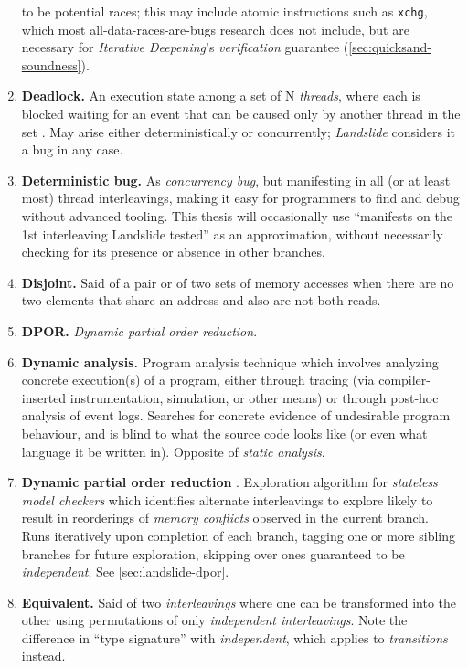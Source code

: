 \begin{enumerate}
		to be potential races;
		this may include atomic instructions such as {\tt xchg},
		which most all-data-races-are-bugs research does not include,
		but are necessary for {\em Iterative Deepening}'s {\em verification} guarantee
		(\cref{sec:quicksand-soundness}).
	\item {\bf Deadlock.}
		An execution state among a set of N {\em threads},
		where each is blocked waiting for an event that can be caused only by another thread in the set
		\cite{deadlock}.
		May arise either deterministically or concurrently; {\em Landslide} considers it a bug in any case.
	\item {\bf Deterministic bug.}
		As {\em concurrency bug}, but manifesting in all (or at least most) thread interleavings,
		making it easy for programmers to find and debug without advanced tooling.
		This thesis will occasionally use ``manifests on the 1st interleaving Landslide tested''
		as an approximation, without necessarily checking for its presence or absence in other branches.
	\item {\bf Disjoint.}
		Said of a pair or of two sets of memory accesses
		when there are no two elements that share an address and also are not both reads.
	\item {\bf DPOR.} {\em Dynamic partial order reduction}.
	\item {\bf Dynamic analysis.}
		Program analysis technique which involves analyzing concrete execution(s) of a program,
		either through tracing (via compiler-inserted instrumentation, simulation, or other means)
		or through post-hoc analysis of event logs.
		Searches for concrete evidence of undesirable program behaviour,
		and is blind to what the source code looks like (or even what language it be written in).
		Opposite of {\em static analysis}.
	\item {\bf Dynamic partial order reduction} .
		Exploration algorithm for {\em stateless model checkers} which
		identifies alternate interleavings to explore likely to result
		in reorderings of {\em memory conflicts} observed in the current branch.
		Runs iteratively upon completion of each branch, tagging one or more sibling branches
		for future exploration, skipping over ones guaranteed to be {\em independent}.
		See \cref{sec:landslide-dpor}.
	\item {\bf Equivalent.}
		Said of two {\em interleavings} where one can be transformed into the other using
		permutations of only {\em independent interleavings}.
		Note the difference in ``type signature'' with {\em independent}, which applies to {\em transitions} instead.

\end{enumerate}
